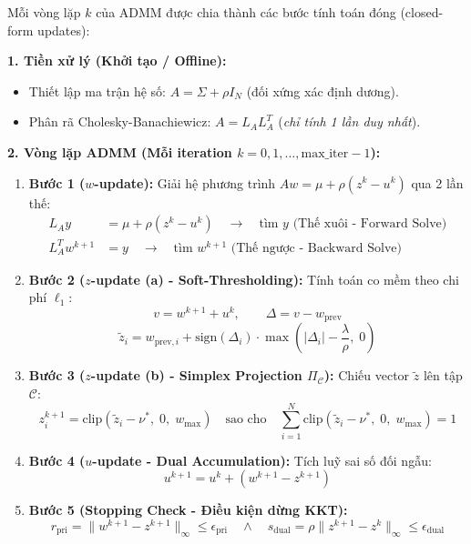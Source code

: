 \documentclass[12pt,a4paper]{article}
\begin{document}
Mỗi vòng lặp $k$ của ADMM được chia thành các bước tính toán đóng (closed-form updates):

\begin{tcolorbox}
\textbf{1. Tiền xử lý (Khởi tạo / Offline):}
\begin{itemize}[leftmargin=1.5em]
    \item Thiết lập ma trận hệ số: $A = \Sigma + \rho I_N$ (đối xứng xác định dương).
    \item Phân rã Cholesky-Banachiewicz: $A = L_A L_A^T$ (\textit{chỉ tính 1 lần duy nhất}).
\end{itemize}

\textbf{2. Vòng lặp ADMM (Mỗi iteration $k = 0, 1, \dots, \text{max\_iter}-1$):}
\begin{enumerate}[leftmargin=1.5em]
    \item \textbf{Bước 1 ($w$-update):} Giải hệ phương trình $A w = \mu + \rho(z^k - u^k)$ qua 2 lần thế:
    \begin{align}
        L_A y &= \mu + \rho (z^k - u^k) \quad \longrightarrow \quad \text{tìm } y \text{ (Thế xuôi - Forward Solve)} \\
        L_A^T w^{k+1} &= y \quad \longrightarrow \quad \text{tìm } w^{k+1} \text{ (Thế ngược - Backward Solve)}
    \end{align}
    \item \textbf{Bước 2 ($z$-update (a) - Soft-Thresholding):} Tính toán co mềm theo chi phí $\ell_1$:
    \begin{equation}
        v = w^{k+1} + u^k, \qquad \Delta = v - w_{\text{prev}}
    \end{equation}
    \begin{equation}
        \tilde{z}_i = w_{\text{prev}, i} + \text{sign}(\Delta_i) \cdot \max\left( |\Delta_i| - \frac{\lambda}{\rho}, \; 0 \right)
    \end{equation}
    \item \textbf{Bước 3 ($z$-update (b) - Simplex Projection $\Pi_{\mathcal{C}}$):} Chiếu vector $\tilde{z}$ lên tập $\mathcal{C}$:
    \begin{equation}
        z_i^{k+1} = \text{clip}(\tilde{z}_i - \nu^*, \; 0, \; w_{\max}) \quad \text{sao cho} \quad \sum_{i=1}^N \text{clip}(\tilde{z}_i - \nu^*, \; 0, \; w_{\max}) = 1
    \end{equation}
    \item \textbf{Bước 4 ($u$-update - Dual Accumulation):} Tích luỹ sai số đối ngẫu:
    \begin{equation}
        u^{k+1} = u^k + (w^{k+1} - z^{k+1})
    \end{equation}
    \item \textbf{Bước 5 (Stopping Check - Điều kiện dừng KKT):}
    \begin{equation}
        r_{\text{pri}} = \|w^{k+1} - z^{k+1}\|_\infty \le \epsilon_{\text{pri}} \quad \land \quad s_{\text{dual}} = \rho \|z^{k+1} - z^k\|_\infty \le \epsilon_{\text{dual}}
    \end{equation}
\end{enumerate}
\end{tcolorbox}
\end{document}
